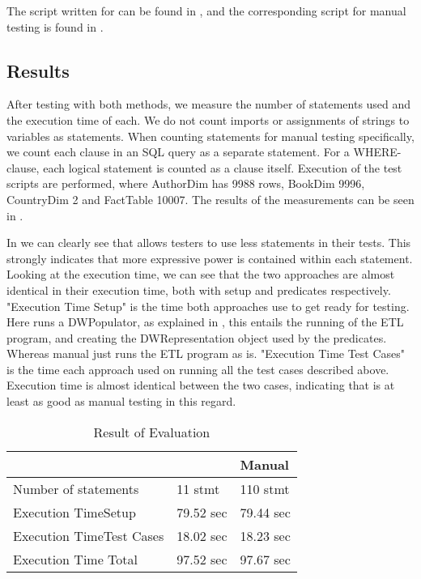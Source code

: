The script written for \FW{} can be found in , and the corresponding script for manual testing is found in .

\subsection{Results}
After testing with both methods, we measure the number of statements used and the execution time of each. We do not count imports or assignments of strings to variables as statements. When counting statements for manual testing specifically, we count each clause in an SQL query as a separate statement. For a WHERE-clause, each logical statement is counted as a clause itself. Execution of the test scripts are performed, where AuthorDim has 9988 rows, BookDim 9996, CountryDim 2 and FactTable 10007. The results of the measurements can be seen in .

In  we can clearly see that \FW{} allows testers to use less statements in their tests. This strongly indicates that more expressive power is contained within each statement. Looking at the execution time, we can see that the two approaches are almost identical in their execution time, both with setup and predicates respectively. "Execution Time Setup" is the time both approaches use to get ready for testing. Here \FW{} runs a DWPopulator, as explained in , this entails the running of the ETL program, and creating the DWRepresentation object used by the predicates. Whereas manual just runs the ETL program as is. "Execution Time Test Cases" is the time each approach used on running all the test cases described above. Execution time is almost identical between the two cases, indicating that \FW{} is at least as good as manual testing in this regard.

\begin{table}[h]
\centering
\caption{Result of Evaluation}
\label{table:result}
\begin{tabular}{|p{}|p{}|p{}|}
\hline
																			 & \FW{} 	& Manual \\ \hline
Number of statements 									 & 11 stmt 		 & 110 stmt 	 \\ \hline
Execution Time\newline Setup 					 & 79.52 sec & 79.44 sec \\ \hline
Execution Time\newline Test Cases 			 & 18.02 sec & 18.23 sec \\ \hline
Execution Time Total 										 & 97.52 sec & 97.67 sec \\ \hline

\end{tabular}
\end{table}